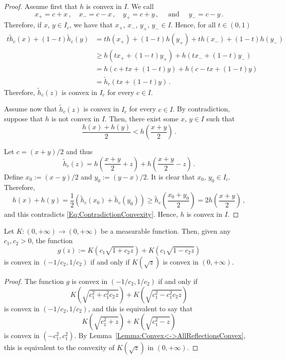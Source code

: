 \begin{proof}
Assume first that $h$ is convex in $I$. We call
$$
x_+ = c + x\,, \quad x_- = c - x\,, \quad y_+ = c + y\,, \quad \textrm{ and } \quad y_- = c - y\,.
$$
Therefore, if $x$, $y\in I_c$, we have that $x_+$, $x_-$, $y_+$, $y_- \in I$. Hence, for all $t\in (0,1)$
\begin{align*}
t\widetilde{h}_c(x) + (1-t)\widetilde{h}_c(y)
&=  th(x_+) + (1-t)h(y_+) + t h(x_-) + (1-t)h(y_-) \\
&\geq h(tx_+ + (1-t)y_+) + h(tx_- + (1-t)y_-) \\
&= h(c + tx + (1-t)y) + h(c-tx + (1-t)y) \\
& = \widetilde{h}_c(tx + (1-t)y)\,.
\end{align*}
Therefore, $\widetilde{h}_c(z)$ is convex in $I_c$ for every $c\in I$.

Assume now that $\widetilde{h}_c(z)$ is convex in $I_c$ for every $c\in I$. By contradiction, suppose that $h$ is not convex in $I$. Then, there exist some $x$, $y\in I$ such that
\begin{equation}
\label{Eq:ContradictionConvexity}
\dfrac{h(x) + h(y)}{2} < h \left (\dfrac{x+y}{2}\right )\,.
\end{equation}

Let $c = (x+y)/2$ and thus
$$
\widetilde{h}_c(z) = h\left( \dfrac{x+y}{2} + z\right) +  h\left( \dfrac{x+y}{2} - z\right)\,.
$$
Define $ x_0 := (x-y)/2$ and $y_0:= (y-x)/2$. It is clear that $x_0$, $y_0\in I_c$. Therefore,
$$
h(x) + h(y) = \dfrac{1}{2} \left( \widetilde{h}_c(x_0) + \widetilde{h}_c(y_0)\right )
\geq \widetilde{h}_c \left( \dfrac{x_0 + y_0}{2}\right )
= 2 h \left (\dfrac{x+y}{2}\right )\,,
$$
and this contradicts \eqref{Eq:ContradictionConvexity}. Hence, $h$ is convex in $I$.
\end{proof}


\begin{corollary}
\label{Cor:gConvex<->K(sqrt)convex}
Let $K:(0,+\infty) \to (0,+\infty)$ be a measurable function. Then, given any $c_1,c_2>0$, the function
$$
g(z) := K \left (c_1 \sqrt{1 + c_2 z}\right) +  K \left (c_1 \sqrt{1 - c_2 z}\right)
$$
is  convex in $(-1/c_2, 1/c_2)$ if and only if $K(\sqrt{z})$ is convex in $(0, +\infty)$.
\end{corollary}
\begin{proof}
The function $g$ is  convex in $(-1/c_2, 1/c_2)$ if and only if
$$
K \left (\sqrt{c_1^2 + c_1^2c_2 z}\right) +  K \left (\sqrt{c_1^2 - c_1^2c_2 z}\right)
$$
is  convex in $(-1/c_2, 1/c_2)$, and this is equivalent to say that
$$
K \left(\sqrt{c_1^2 + z}\right) +  K \left(\sqrt{c_1^2 - z}\right)
$$
is convex in $(-c_1^2, c_1^2)$. By Lemma~\ref{Lemma:Convex<->AllReflectionsConvex}, this is equivalent to the convexity of $K(\sqrt{z})$ in $(0, +\infty)$.
\end{proof}

